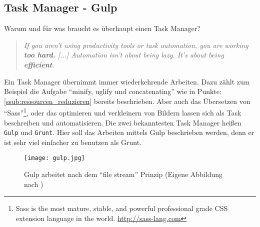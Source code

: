	\subsection{Task Manager - Gulp} %
	\label{sub:task_manager_gulp}
		Warum und für was braucht es überhaupt einen Task Manager?
		\begin{quote}
			\textit{If you aren't using productivity tools or task automation, you are working \textbf{too hard.} [...] Automation isn't about being lazy. It's about being \textbf{efficient}.}\autocite[p. 18,78]{addyOsmani14}
		\end{quote}
		Ein Task Manager übernimmt immer wiederkehrende Arbeiten. Dazu zählt zum Beispiel die Aufgabe "`minify, uglify und concatenating"' wie in Punkte: \ref{ssub:ressourcen_reduzieren} bereits beschrieben. Aber auch das Übersetzen von "`Sass"'\footnote{Sass is the most mature, stable, and powerful professional grade CSS extension language in the world. \url{http://sass-lang.com}}, oder das optimieren und verkleinern von Bildern lassen sich als Task beschreiben und automatisieren.
		Die zwei bekanntesten Task Manager heißen \texttt{Gulp} und \texttt{Grunt}. Hier soll das Arbeiten mittels Gulp beschrieben werden, denn er ist sehr viel einfacher zu benutzen als Grunt.

		\begin{figure}[htbp]
			\begin{center}
				\texttt{[image: gulp.jpg]}
				\caption{Gulp arbeitet nach dem "`file stream"' Prinzip (Eigene Abbildung nach \autocite[p. 85]{addyOsmani14})}
				\label{fig:gulp}
			\end{center}
		\end{figure}

